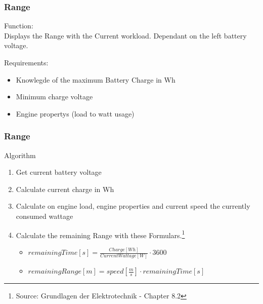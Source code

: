 \documentclass{beamer}
\begin{document}
\begin{frame}
    \frametitle{Range}
    Function:\\
    Displays the Range with the Current workload. Dependant on the left battery voltage.

    Requirements:
    \begin{itemize}
        \item Knowlegde of the maximum Battery Charge in Wh
        \item Minimum charge voltage
        \item Engine propertys (load to watt usage)
    \end{itemize}
    

\end{frame}
\begin{frame}
    \frametitle{Range}
    Algorithm
    \begin{enumerate}
     \item Get current battery voltage
     \item Calculate current charge in Wh
     \item Calculate on engine load, engine properties and current speed the currently consumed wattage
     \item Calculate the remaining Range with these Formulars.\footnote{Source: Grundlagen der Elektrotechnik - Chapter 8.2}
     \begin{itemize}
        \item $remainingTime\left[ s \right]=\frac{Charge\left[ Wh \right]}{Current Wattage\left[ W \right]}\cdot3600$
        \item $remainingRange\left[ m \right]=speed\left[ \frac{m}{s} \right]\cdot remainingTime\left[ s \right]$
     \end{itemize}
    \end{enumerate}
\end{frame}
\end{document}
